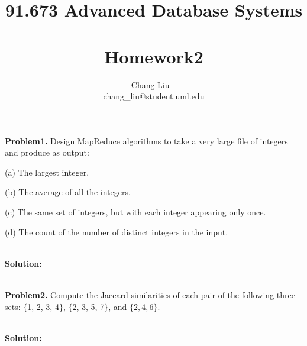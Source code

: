 \documentclass{article}
\author{Chang Liu ~\\ chang\_liu@student.uml.edu}
\title{91.673 Advanced Database Systems ~\\ Homework2}
\begin{document}
\maketitle



\noindent \textbf{Problem1.} Design MapReduce algorithms to take a very large file of integers and produce as output:

(a) The largest integer.

(b) The average of all the integers.

(c) The same set of integers, but with each integer appearing only once.

(d) The count of the number of distinct integers in the input.

~\\

\noindent \textbf{Solution:}


~\\

\noindent \textbf{Problem2.} Compute the Jaccard similarities of each pair of the following three sets: $\{$1, 2, 3, 4$\}$, $\{$2, 3, 5, 7$\}$, and $\{2, 4, 6\}$.

~\\

\noindent \textbf{Solution:}
\end{document}
